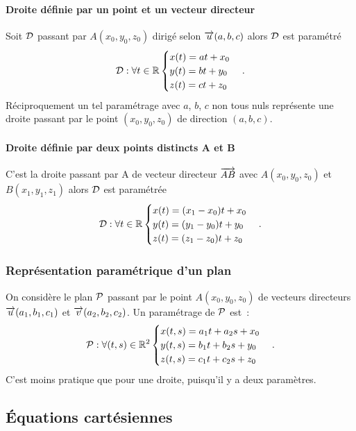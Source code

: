 \paragraph{Droite définie par un point et un vecteur directeur}
Soit \(\Dr\) passant par \(A(x_0,y_0,z_0)\) dirigé selon \(\vu(a,b,c)\) alors \(\Dr\) est paramétré 
\begin{equation}
  \Dr : \forall t\in\R
  \begin{cases}
    x(t)=at+x_0\\y(t)=bt+y_0\\z(t)=ct+z_0
  \end{cases}.
\end{equation}
Réciproquement un tel paramétrage avec \(a\), \(b\), \(c\) non tous nuls représente une droite passant par le point \((x_0,y_0,z_0)\) de direction \((a,b,c)\).

\paragraph{Droite définie par deux points distincts A et B}
C'est la droite passant par A de vecteur directeur \(\vect{AB}\) avec \(A(x_0,y_0,z_0)\) et \(B(x_1,y_1,z_1)\) alors \(\Dr\) est paramétrée
\begin{equation}
  \Dr : \forall t\in\R
  \begin{cases}
    x(t)=(x_1-x_0)t+x_0\\y(t)=(y_1-y_0)t+y_0\\z(t)=(z_1-z_0)t+z_0
  \end{cases}.
\end{equation}

\subsubsection{Représentation paramétrique d'un plan}
On considère le plan \(\P\) passant par le point \(A(x_0,y_0,z_0)\) de vecteurs directeurs \(\vu(a_1,b_1,c_1)\) et \(\vv(a_2,b_2,c_2)\). Un paramétrage de \(\P\) est~:
\begin{equation}
  \P : \forall (t,s)\in\R^2
  \begin{cases}
    x(t,s)=a_1t+a_2s+x_0\\y(t,s)=b_1t+b_2s+y_0\\z(t,s)=c_1t+c_2s+z_0
  \end{cases}.
\end{equation}
C'est moins pratique que pour une droite, puisqu'il y a deux paramètres.

\subsection{Équations cartésiennes}

